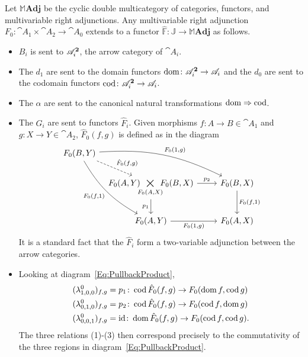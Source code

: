 \begin{example}\label{Ex:PullbackProduct}
Let $\mathbb{M}\mathbf{Adj}$ be the cyclic double multicategory of categories, functors, and multivariable right adjunctions. Any multivariable right adjunction $F_0\colon \cat{A}_1\times \cat{A}_2\to \cat{A}_0$ extends to a functor $\widehat{\mathbb{F}}\colon\mathbb{J}\to\mathbb{M}\mathbf{Adj}$ as follows.
\begin{itemize}
	\item $B_i$ is sent to $\mathscr{A}_i^{\mathbf{2}}$, the arrow category of $\cat{A}_i$.
	\item The $d_1$ are sent to the domain functors $\operatorname{dom}\colon\mathscr{A}_i^{\mathbf{2}}\to\mathscr{A}_i$ and the $d_0$ are sent to the codomain functors $\operatorname{cod}\colon\mathscr{A}_i^{\mathbf{2}}\to\mathscr{A}_i$.
	\item The $\alpha$ are sent to the canonical natural transformations $\operatorname{dom}\Rightarrow\operatorname{cod}$.
	\item The $G_i$ are sent to functors $\hat{F}_i$. Given morphisms $f\colon A\to B\in\cat{A}_1$ and $g\colon X\to Y\in\cat{A}_2$, $\hat{F}_0(f,g)$ is defined as in the diagram
	\begin{equation}\label{Eq:PullbackProduct}
	\begin{tikzcd}[bend angle=15]
		F_0(B,Y) \arrow[bend left]{rrd}{F_0(1,g)}
			\arrow[bend right]{rdd}[swap]{F_0(f,1)}
			\arrow[dashed]{dr}{\hat{F}_0(f,g)}
		&[-4ex]& \\
		& F_0(A,Y)\!\!\underset{F_0(A,X)}{\bigtimes}\!\!F_0(B,X)
			\rar{p_2}
			\dar[swap]{p_1}
		& F_0(B,X) \dar{F_0(f,1)} \\
		& F_0(A,Y) \rar[swap]{F_0(1,g)} & F_0(A,X)
	\end{tikzcd}
	\end{equation}
	It is a standard fact that the $\hat{F}_i$ form a two-variable adjunction between the arrow categories. 
	\item Looking at diagram~\eqref{Eq:PullbackProduct}, 
	\begin{align*}
		(\lambda^0_{1,0,0})_{f,g}&=p_1\colon \operatorname{cod}\hat{F}_0(f,g)\to F_0(\operatorname{dom} f,\operatorname{cod} g)\\
		(\lambda^0_{0,1,0})_{f,g}&=p_2\colon \operatorname{cod}\hat{F}_0(f,g)\to F_0(\operatorname{cod} f,\operatorname{dom} g)\\
		(\lambda^0_{0,0,1})_{f,g}&=\operatorname{id}\colon \operatorname{dom}\hat{F}_0(f,g)\to F_0(\operatorname{cod} f,\operatorname{cod} g).
	\end{align*}
	The three relations (1)-(3) then correspond precisely to the commutativity of the three regions in diagram~\eqref{Eq:PullbackProduct}.
\end{itemize}
\end{example}

